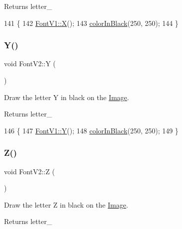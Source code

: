 \begin{DoxyReturn}{Returns}
letter\+\_\+ 
\end{DoxyReturn}

\begin{DoxyCode}
141                \{
142     \mbox{\hyperlink{class_font_v1_a8a93144edcf0f9bf1ac9017eb916ff82}{FontV1::X}}();
143     \mbox{\hyperlink{class_font_v2_a04f2501961bc286ce70fbb6a840b0e8a}{colorInBlack}}(250, 250);
144 \}
\end{DoxyCode}
\mbox{\label{class_font_v2_a858b25a33231fe1a78539d040e59f0ee}} 
\subsubsection{\texorpdfstring{Y()}{Y()}}
{\footnotesize\ttfamily void Font\+V2\+::Y (\begin{DoxyParamCaption}{ }\end{DoxyParamCaption})}



Draw the letter Y in black on the \mbox{\hyperlink{class_image}{Image}}. 

\begin{DoxyReturn}{Returns}
letter\+\_\+ 
\end{DoxyReturn}

\begin{DoxyCode}
146                \{
147     \mbox{\hyperlink{class_font_v1_a25827e105e44581040d8c17cc821e4f3}{FontV1::Y}}();
148     \mbox{\hyperlink{class_font_v2_a04f2501961bc286ce70fbb6a840b0e8a}{colorInBlack}}(250, 250);
149 \}
\end{DoxyCode}
\mbox{\label{class_font_v2_a9650b871667f1c226d6e0e042f311a51}} 
\subsubsection{\texorpdfstring{Z()}{Z()}}
{\footnotesize\ttfamily void Font\+V2\+::Z (\begin{DoxyParamCaption}{ }\end{DoxyParamCaption})}



Draw the letter Z in black on the \mbox{\hyperlink{class_image}{Image}}. 

\begin{DoxyReturn}{Returns}
letter\+\_\+ 
\end{DoxyReturn}

